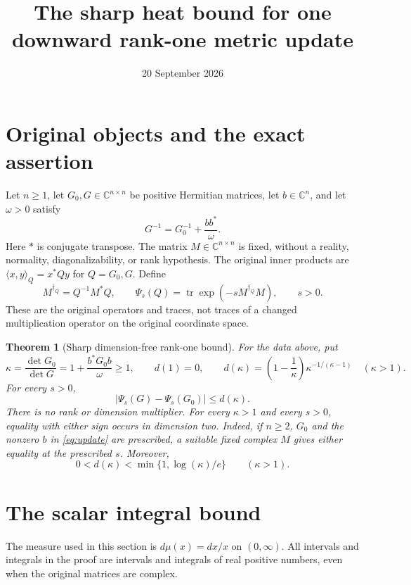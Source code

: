 \documentclass[11pt]{article}
\title{The sharp heat bound for one downward rank-one metric update}
\author{}
\date{20 September 2026}
\newtheorem{theorem}{Theorem}
\newcommand{\tr}{\operatorname{tr}}
\begin{document}
\maketitle

\section{Original objects and the exact assertion}
Let $n\geq1$, let $G_0,G\in\mathbb C^{n\times n}$ be positive
Hermitian matrices, let $b\in\mathbb C^n$, and let $\omega>0$ satisfy
\begin{equation}\label{eq:update}
 G^{-1}=G_0^{-1}+\frac{bb^*}{\omega}.
\end{equation}
Here $*$ is conjugate transpose. The matrix $M\in\mathbb C^{n\times n}$
is fixed, without a reality, normality, diagonalizability, or rank
hypothesis. The original inner products are
$\langle x,y\rangle_Q=x^*Qy$ for $Q=G_0,G$. Define
\begin{equation}\label{eq:original-observable}
 M^{\dagger_Q}=Q^{-1}M^*Q,\qquad
 \Psi_s(Q)=\tr\exp(-sM^{\dagger_Q}M),\qquad s>0.
\end{equation}
These are the original operators and traces, not traces of a changed
multiplication operator on the original coordinate space.

\begin{theorem}[Sharp dimension-free rank-one bound]\label{thm:main}
For the data above, put
\begin{equation}\label{eq:kappa}
 \kappa=\frac{\det G_0}{\det G}
       =1+\frac{b^*G_0b}{\omega}\geq1,
 \qquad
 d(1)=0,\qquad
 d(\kappa)=\left(1-\frac1\kappa\right)
                    \kappa^{-1/(\kappa-1)}\quad(\kappa>1).
\end{equation}
For every $s>0$,
\begin{equation}\label{eq:sharp-bound}
 \left|\Psi_s(G)-\Psi_s(G_0)\right|\leq d(\kappa).
\end{equation}
There is no rank or dimension multiplier. For every $\kappa>1$ and
every $s>0$, equality with either sign occurs in dimension two.
Indeed, if $n\geq2$, $G_0$ and the nonzero $b$ in
\eqref{eq:update} are prescribed, a suitable fixed complex $M$ gives
either equality at the prescribed $s$. Moreover,
\begin{equation}\label{eq:strict-improvement}
 0<d(\kappa)<\min\{1,\log(\kappa)/e\}\qquad(\kappa>1).
\end{equation}
\end{theorem}

\section{The scalar integral bound}
The measure used in this section is $d\mu(x)=dx/x$ on $(0,\infty)$.
All intervals and integrals in the proof are intervals and integrals of
real positive numbers, even when the original matrices are complex.
\end{document}
